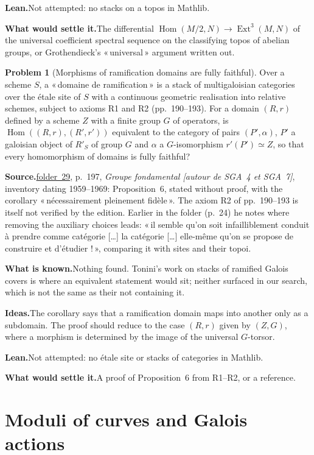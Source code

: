 \documentclass[11pt]{article}
\newcommand{\q}[1]{«\,#1\,»}
\newcommand{\fac}[1]{\href{https://grothendieck.umontpellier.fr/#1.pdf}{folder~#1}}
\newcommand{\Ext}{\operatorname{Ext}}
\theoremstyle{definition}
\newtheorem{problem}{Problem}
\theoremstyle{plain}\newtheorem*{proposition}{Proposition}\theoremstyle{definition}
\newcommand{\entry}[1]{\par\medskip\noindent\textbf{#1}\enspace}
\newcommand{\src}[1]{\entry{Source.}#1}
\newcommand{\known}{\entry{What is known.}}
\newcommand{\ideas}{\entry{Ideas.}}
\newcommand{\leanst}{\entry{Lean.}}
\newcommand{\settle}{\entry{What would settle it.}}
\begin{document}
\leanst Not attempted: no stacks on a topos in Mathlib.

\settle The differential $\operatorname{Hom}(M/2, N) \to \Ext^3(M, N)$ of the universal coefficient spectral sequence on the classifying topos of abelian groups, or Grothendieck's \q{universal} argument written out.

\begin{problem}[Morphisms of ramification domains are fully faithful]\label{p:domram}
Over a scheme $S$, a \q{domaine de ramification} is a stack of multigaloisian categories over the étale site of $S$ with a continuous geometric realisation into relative schemes, subject to axioms R1 and R2 (pp.~190--193). For a domain $(R, r)$ defined by a scheme $Z$ with a finite group $G$ of operators, is $\operatorname{Hom}((R, r), (R', r'))$ equivalent to the category of pairs $(P', \alpha)$, $P'$ a galoisian object of $R'_S$ of group $G$ and $\alpha$ a $G$-isomorphism $r'(P') \simeq Z$, so that every homomorphism of domains is fully faithful?
\end{problem}

\src{\fac{29}, p.~197, \emph{Groupe fondamental [autour de SGA~4 et SGA~7]}, inventory dating 1959--1969: Proposition~6, stated without proof, with the corollary \q{nécessairement pleinement fidèle}. The axiom R2 of pp.~190--193 is itself not verified by the edition. Earlier in the folder (p.~24) he notes where removing the auxiliary choices leads: \q{il semble qu'on soit infailliblement conduit à prendre comme catégorie [\dots] la catégorie [\dots] elle-même qu'on se propose de construire et d'étudier !}, comparing it with sites and their topoi.}

\known Nothing found. Tonini's work on stacks of ramified Galois covers \cite{tonini2013,tonini2017} is where an equivalent statement would sit; neither surfaced in our search, which is not the same as their not containing it.

\ideas The corollary says that a ramification domain maps into another only as a subdomain. The proof should reduce to the case $(R, r)$ given by $(Z, G)$, where a morphism is determined by the image of the universal $G$-torsor.

\leanst Not attempted: no étale site or stacks of categories in Mathlib.

\settle A proof of Proposition~6 from R1--R2, or a reference.

\section{Moduli of curves and Galois actions}
\end{document}
